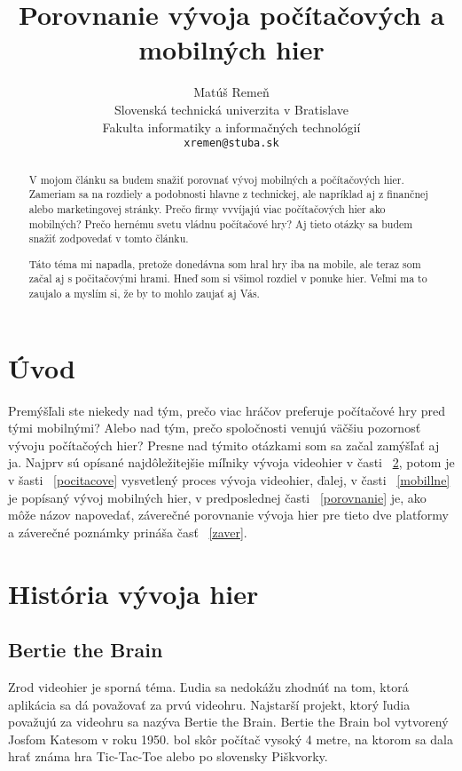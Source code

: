 \documentclass[10pt,twoside,slovak,a4paper]{article}
\title{Porovnanie vývoja počítačových a mobilných hier}
\author{Matúš Remeň\\[2pt]
	{\small Slovenská technická univerzita v Bratislave}\\
	{\small Fakulta informatiky a informačných technológií}\\
	{\small \texttt{xremen@stuba.sk}}
	}
\date{\small              }
\begin{document}
\maketitle

\begin{abstract}
V mojom článku sa budem snažiť porovnať vývoj mobilných a počítačových hier. Zameriam sa na rozdiely a podobnosti hlavne z technickej, ale napríklad aj z finančnej alebo marketingovej stránky. Prečo firmy vvvíjajú viac počítačových hier ako mobilných? Prečo hernému svetu vládnu počítačové hry? Aj tieto otázky sa budem snažiť zodpovedať v tomto článku.

Táto téma mi napadla, pretože donedávna som hral hry iba na mobile, ale teraz som začal aj s počitačovými hrami. Hneď som si všimol rozdiel v ponuke hier. Veľmi ma to zaujalo  a myslím si, že by to mohlo zaujať aj Vás.
\end{abstract}



\section{Úvod}

Premýšľali ste niekedy nad tým, prečo viac hráčov preferuje počítačové hry pred tými mobilnými? Alebo nad tým, prečo spoločnosti venujú väčšiu pozornosť vývoju počítačoých hier? Presne nad týmito otázkami som sa začal zamýšľať aj ja. Najprv sú opísané najdôležitejšie míľniky vývoja videohier v časti ~\ref{historia}, potom je v šasti ~\ref{pocitacove} vysvetlený proces vývoja videohier, ďalej, v časti ~\ref{mobillne} je popísaný vývoj mobilných hier, v predposlednej časti ~\ref{porovnanie} je, ako môže názov napovedať, záverečné porovnanie vývoja hier pre tieto dve platformy a záverečné poznámky prináša časť ~\ref{zaver}.
\section{História vývoja hier} \label{historia} 

\subsection{Bertie the Brain} \label{historia:bertie}
Zrod videohier je sporná téma. Ľudia sa nedokážu zhodnúť na tom, ktorá aplikácia sa dá považovať za prvú videohru. Najstarší projekt, ktorý ľudia považujú za videohru sa nazýva Bertie the Brain. Bertie the Brain bol vytvorený Josfom Katesom v roku 1950. bol skôr počítač vysoký 4 metre, na ktorom sa dala hrať známa hra Tic-Tac-Toe alebo po slovensky Piškvorky.
\end{document}
